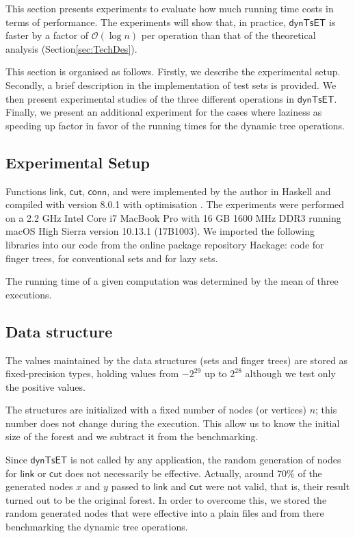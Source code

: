 \documentclass{elsarticle}
\newcommand{\code}[1]{\haskell{#1}}
\newcommand{\MATHSF}[1]{\ensuremath{\mathsf{#1}}\xspace}
\newcommand{\link}{\MATHSF{link}}
\newcommand{\cut}{\MATHSF{cut}}
\newcommand{\conn}{\MATHSF{conn}}
\newcommand{\dyntset}{\MATHSF{dynTsET}}
\renewcommand{\O}{\ensuremath{\mathcal{O}}}
\begin{document}
This section presents experiments to evaluate how much running time costs in terms of performance. The experiments will show that, in practice, \dyntset is faster by a factor of $\O(\log n)$ per operation than that of the theoretical analysis (Section\ref{sec:TechDes}).

This section is organised as follows. Firstly, we describe the experimental setup. Secondly, a brief description in the implementation of test sets is provided. We then present experimental studies of the three different operations in \dyntset. Finally, we present an additional experiment for the cases where laziness as speeding up factor in favor of the running times for the dynamic tree operations.


\subsection{Experimental Setup}
Functions \link, \cut, \conn, \code{root} and \code{reroot} were implemented by the author in Haskell and compiled with \code{ghc} version 8.0.1 with optimisation \code{-O2}. The experiments were performed on a 2.2 GHz Intel Core i7 MacBook Pro with 16 GB 1600 MHz DDR3 running macOS High Sierra version 10.13.1 (17B1003). We imported the following libraries into our code from the online package repository Hackage: \cite{HaskellFT} code for finger trees, \cite{HaskellSet} for conventional sets and \cite{HaskellEdison} for lazy sets.

The running time of a given computation was determined by the mean of three executions.

\subsection{Data structure} 

The values maintained by the data structures (sets and finger trees) are stored as fixed-precision \code{Int} types, holding values from $-2^{29}$ up to $2^{28}$ although we test only the positive values.

The structures are initialized with a fixed number of nodes (or vertices) $n$; this number does not change during the execution. This allow us to know the initial size of the forest and we subtract it from the benchmarking.

Since \dyntset is not called by any application, the random generation of nodes for \link or \cut does not necessarily be effective. Actually, around 70\% of the generated nodes $x$ and $y$ passed to \link and \cut were not valid, that is, their result turned out to be the original forest. In order to overcome this, we stored the random generated nodes that were effective into a plain files and from there benchmarking the dynamic tree operations.
\end{document}
